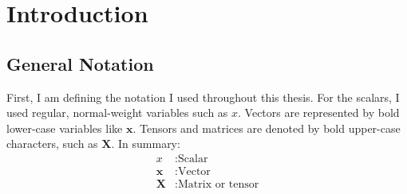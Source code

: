 
\chapter{Introduction}
\label{ch:introduction}

\section{General Notation}
First, I am defining the notation I used throughout this thesis. For the scalars, I used regular, normal-weight variables such as $x$. Vectors are represented by bold lower-case variables like $\mathbf{x}$. Tensors and matrices are denoted by bold upper-case characters, such as $\mathbf{X}$. In summary:
\begin{align*}
x&: \text{Scalar} \\
\mathbf{x}&: \text{Vector} \\
\mathbf{X}&: \text{Matrix or tensor}
\end{align*}

